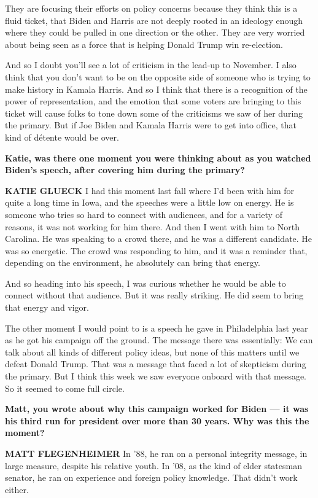 They are focusing their efforts on policy concerns because they think
this is a fluid ticket, that Biden and Harris are not deeply rooted in
an ideology enough where they could be pulled in one direction or the
other. They are very worried about being seen as a force that is helping
Donald Trump win re-election.

And so I doubt you'll see a lot of criticism in the lead-up to November.
I also think that you don't want to be on the opposite side of someone
who is trying to make history in Kamala Harris. And so I think that
there is a recognition of the power of representation, and the emotion
that some voters are bringing to this ticket will cause folks to tone
down some of the criticisms we saw of her during the primary. But if Joe
Biden and Kamala Harris were to get into office, that kind of détente
would be over.

\textbf{Katie, was there one moment you were thinking about as you
watched Biden's speech, after covering him during the primary?}

\textbf{KATIE GLUECK} I had this moment last fall where I'd been with
him for quite a long time in Iowa, and the speeches were a little low on
energy. He is someone who tries so hard to connect with audiences, and
for a variety of reasons, it was not working for him there. And then I
went with him to North Carolina. He was speaking to a crowd there, and
he was a different candidate. He was so energetic. The crowd was
responding to him, and it was a reminder that, depending on the
environment, he absolutely can bring that energy.

And so heading into his speech, I was curious whether he would be able
to connect without that audience. But it was really striking. He did
seem to bring that energy and vigor.

The other moment I would point to is a speech he gave in Philadelphia
last year as he got his campaign off the ground. The message there was
essentially: We can talk about all kinds of different policy ideas, but
none of this matters until we defeat Donald Trump. That was a message
that faced a lot of skepticism during the primary. But I think this week
we saw everyone onboard with that message. So it seemed to come full
circle.

\textbf{Matt, you wrote about why this campaign worked for Biden --- it
was his third run for president over more than 30 years. Why was this
the moment?}

\textbf{MATT FLEGENHEIMER} In '88, he ran on a personal integrity
message, in large measure, despite his relative youth. In '08, as the
kind of elder statesman senator, he ran on experience and foreign policy
knowledge. That didn't work either.

